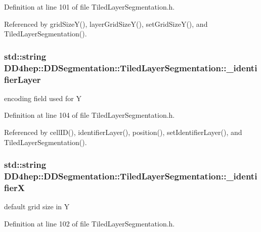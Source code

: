 Definition at line 101 of file TiledLayerSegmentation.h.

Referenced by gridSizeY(), layerGridSizeY(), setGridSizeY(), and TiledLayerSegmentation().\hypertarget{class_d_d4hep_1_1_d_d_segmentation_1_1_tiled_layer_segmentation_a83e95ac7e65a186e5b15c4b72e57e1c6}{
\subsubsection[{\_\-identifierLayer}]{\setlength{\rightskip}{0pt plus 5cm}std::string {\bf DD4hep::DDSegmentation::TiledLayerSegmentation::\_\-identifierLayer}}}
\label{class_d_d4hep_1_1_d_d_segmentation_1_1_tiled_layer_segmentation_a83e95ac7e65a186e5b15c4b72e57e1c6}


encoding field used for Y 

Definition at line 104 of file TiledLayerSegmentation.h.

Referenced by cellID(), identifierLayer(), position(), setIdentifierLayer(), and TiledLayerSegmentation().\hypertarget{class_d_d4hep_1_1_d_d_segmentation_1_1_tiled_layer_segmentation_ac79fffb5bdd56134ef2824ebb10ac1de}{
\subsubsection[{\_\-identifierX}]{\setlength{\rightskip}{0pt plus 5cm}std::string {\bf DD4hep::DDSegmentation::TiledLayerSegmentation::\_\-identifierX}}}
\label{class_d_d4hep_1_1_d_d_segmentation_1_1_tiled_layer_segmentation_ac79fffb5bdd56134ef2824ebb10ac1de}


default grid size in Y 

Definition at line 102 of file TiledLayerSegmentation.h.

